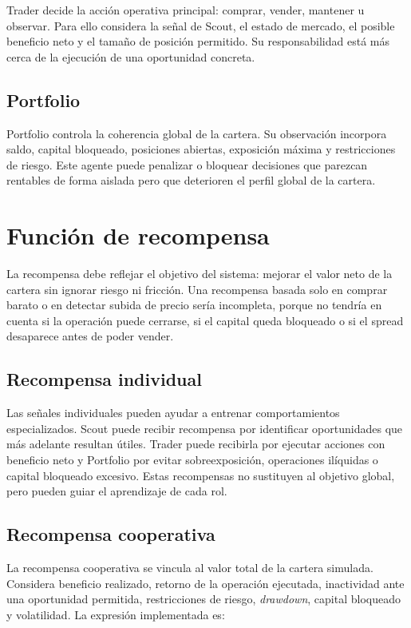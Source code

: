 Trader decide la acción operativa principal: comprar, vender, mantener u observar. Para ello considera la señal de Scout, el estado de mercado, el posible beneficio neto y el tamaño de posición permitido. Su responsabilidad está más cerca de la ejecución de una oportunidad concreta.

\subsection{Portfolio}

Portfolio controla la coherencia global de la cartera. Su observación incorpora saldo, capital bloqueado, posiciones abiertas, exposición máxima y restricciones de riesgo. Este agente puede penalizar o bloquear decisiones que parezcan rentables de forma aislada pero que deterioren el perfil global de la cartera.

\section{Función de recompensa}

La recompensa debe reflejar el objetivo del sistema: mejorar el valor neto de la cartera sin ignorar riesgo ni fricción. Una recompensa basada solo en comprar barato o en detectar subida de precio sería incompleta, porque no tendría en cuenta si la operación puede cerrarse, si el capital queda bloqueado o si el spread desaparece antes de poder vender.

\subsection{Recompensa individual}

Las señales individuales pueden ayudar a entrenar comportamientos especializados. Scout puede recibir recompensa por identificar oportunidades que más adelante resultan útiles. Trader puede recibirla por ejecutar acciones con beneficio neto y Portfolio por evitar sobreexposición, operaciones ilíquidas o capital bloqueado excesivo. Estas recompensas no sustituyen al objetivo global, pero pueden guiar el aprendizaje de cada rol.

\subsection{Recompensa cooperativa}

La recompensa cooperativa se vincula al valor total de la cartera simulada. Considera beneficio realizado, retorno de la operación ejecutada, inactividad ante una oportunidad permitida, restricciones de riesgo, \textit{drawdown}, capital bloqueado y volatilidad. La expresión implementada es:

